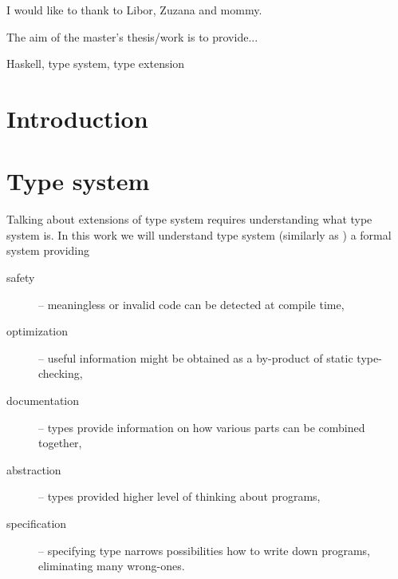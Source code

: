 \documentclass[11pt,oneside,draft]{fithesis2}
\begin{document}
\FrontMatter
\ThesisTitlePage

\begin{ThesisDeclaration}
\DeclarationText
\AdvisorName
\end{ThesisDeclaration}

\begin{ThesisThanks}
I would like to thank to Libor, Zuzana and mommy.
\end{ThesisThanks}

\begin{ThesisAbstract}
The aim of the master's thesis/work is to provide...
\end{ThesisAbstract}

\begin{ThesisKeyWords}
Haskell, type system, type extension
\end{ThesisKeyWords}

\tableofcontents

\MainMatter

\chapter{Introduction}

\chapter{Type system}

Talking about extensions of type system requires understanding what type system is.
In this work we will understand type system (similarly as
\cite{pierce:2002:types,barendregt:1992:lambdaProc}) a formal system providing

\begin{description}
	\item[safety] -- meaningless or invalid code can be detected at compile time,
	\item[optimization] -- useful information might be obtained as a by-product of static type-checking,
	\item[documentation] -- types provide information on how various parts can be combined together,
	\item[abstraction] -- types provided higher level of thinking about programs,
	\item[specification] -- specifying type narrows possibilities how to write down programs,
		eliminating many wrong-ones.
\end{description}
\end{document}
